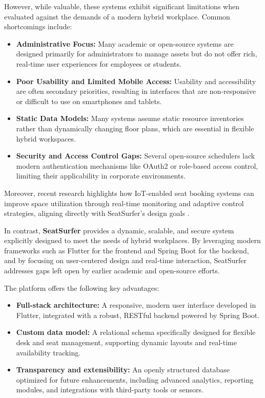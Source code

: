 \documentclass[12pt,a4paper]{report} %
\begin{document}
However, while valuable, these systems exhibit significant limitations when evaluated against the demands of a modern hybrid workplace. Common shortcomings include:

\begin{itemize}
\item \textbf{Administrative Focus:} Many academic or open-source systems are designed primarily for administrators to manage assets but do not offer rich, real-time user experiences for employees or students.
\item \textbf{Poor Usability and Limited Mobile Access:} Usability and accessibility are often secondary priorities, resulting in interfaces that are non-responsive or difficult to use on smartphones and tablets.
\item \textbf{Static Data Models:} Many systems assume static resource inventories rather than dynamically changing floor plans, which are essential in flexible hybrid workspaces.
\item \textbf{Security and Access Control Gaps:} Several open-source schedulers lack modern authentication mechanisms like OAuth2 or role-based access control, limiting their applicability in corporate environments.
\end{itemize}

Moreover, recent research highlights how IoT-enabled seat booking systems can improve space utilization through real-time monitoring and adaptive control strategies, aligning directly with SeatSurfer's design goals \cite{rahman2020iot}.

In contrast, \textbf{SeatSurfer} provides a dynamic, scalable, and secure system explicitly designed to meet the needs of hybrid workplaces. By leveraging modern frameworks such as Flutter for the frontend and Spring Boot for the backend, and by focusing on user-centered design and real-time interaction, SeatSurfer addresses gaps left open by earlier academic and open-source efforts.

The platform offers the following key advantages:
\begin{itemize}
\item \textbf{Full-stack architecture:} A responsive, modern user interface developed in Flutter, integrated with a robust, RESTful backend powered by Spring Boot.
\item \textbf{Custom data model:} A relational schema specifically designed for flexible desk and seat management, supporting dynamic layouts and real-time availability tracking.
\item \textbf{Transparency and extensibility:} An openly structured database optimized for future enhancements, including advanced analytics, reporting modules, and integrations with third-party tools or sensors.
\end{itemize}
\end{document}
